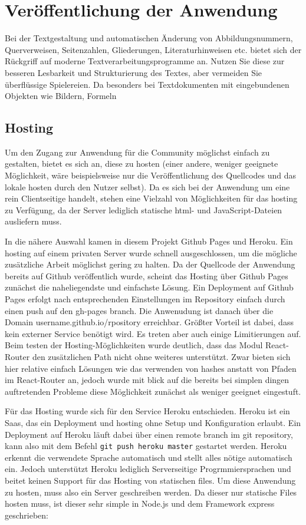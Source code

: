 \chapter{Veröffentlichung der Anwendung}
\thispagestyle{fancy}

Bei der Textgestaltung und automatischen Änderung von Abbildungsnummern, Querverweisen,
Seitenzahlen, Gliederungen, Literaturhinweisen etc. bietet sich der Rückgriff
auf moderne Textverarbeitungsprogramme an. Nutzen Sie diese zur besseren Lesbarkeit
und Strukturierung des Textes, aber vermeiden Sie überflüssige Spielereien. Da
besonders bei Textdokumenten mit eingebundenen Objekten wie Bildern, Formeln

\section{Hosting}
\label{chap:hosting}
Um den Zugang zur Anwendung für die Community möglichst einfach zu gestalten, bietet es sich an, diese zu hosten (einer andere, weniger geeignete Möglichkeit, wäre beispielsweise nur die Veröffentlichung des Quellcodes und das lokale hosten durch den Nutzer selbst).
Da es sich bei der Anwendung um eine rein Clientseitige handelt, stehen eine Vielzahl von Möglichkeiten für das hosting zu Verfügung, da der Server lediglich statische html- und JavaScript-Dateien ausliefern muss.

In die nähere Auswahl kamen in diesem Projekt Github Pages und Heroku. Ein hosting auf einem privaten Server wurde schnell ausgeschlossen, um die mögliche zusätzliche Arbeit möglichst gering zu halten.
Da der Quellcode der Anwendung bereits auf Github veröffentlich wurde, scheint das Hosting über Github Pages zunächst die naheliegendste und einfachste Lösung. Ein Deployment auf Github Pages erfolgt nach entsprechenden Einstellungen im Repository einfach durch einen push auf den gh-pages branch. Die Anwenudung ist danach über die Domain username.github.io/rpository erreichbar. Größter Vorteil ist dabei, dass kein externer Service benötigt wird. Es treten aber auch einige Limitierungen auf. Beim testen der Hosting-Möglichkeiten wurde deutlich, dass das Modul React-Router den zusätzlichen Path nicht ohne weiteres unterstützt. Zwar bieten sich hier relative einfach Lösungen wie das verwenden von hashes anstatt von Pfaden im React-Router an, jedoch wurde mit blick auf die bereits bei simplen dingen auftretenden Probleme diese Möglichkeit zunächst als weniger geeignet eingestuft.

Für das Hosting wurde sich für den Service Heroku entschieden. Heroku ist ein Saas, das ein Deployment und hosting ohne Setup und Konfiguration erlaubt. Ein Deployment auf Heroku läuft dabei über einen remote branch im git repository, kann also mit dem Befehl \verb|git push heroku master| gestartet werden. Heroku erkennt die verwendete Sprache automatisch und stellt alles nötige automatisch ein.
Jedoch unterstützt Heroku lediglich Serverseitige Progrmmiersprachen und beitet keinen Support für das Hosting von statischen files. Um diese Anwendung zu hosten, muss also ein Server geschreiben werden. Da dieser nur statische Files hosten muss, ist dieser sehr simple in Node.js und dem Framework express geschrieben:

